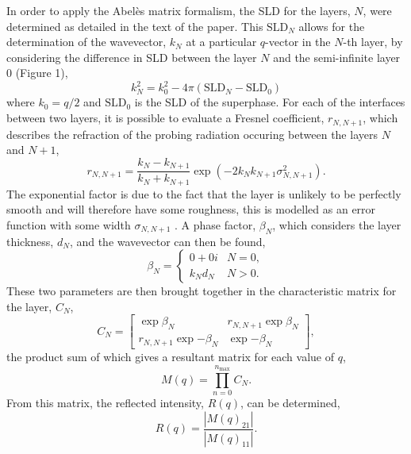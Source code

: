 \documentclass[amsmath,amssymb,superscriptaddress]{revtex4-1}
\begin{document}
In order to apply the Abel\`{e}s matrix formalism, the SLD for the layers, $N$, were determined as detailed in the text of the paper.
This $\text{SLD}_N$ allows for the determination of the wavevector, $k_N$ at a particular $q$-vector in the $N$-th layer, by considering the difference in SLD between the layer $N$ and the semi-infinite layer 0 (Figure 1),
%
\begin{equation}
	k_N^2 = k_0^2 - 4\pi(\text{SLD}_N - \text{SLD}_0)
\end{equation}
%
where $k_0 = q/2$ and $\text{SLD}_0$ is the SLD of the superphase.
For each of the interfaces between two layers, it is possible to evaluate a Fresnel coefficient, $r_{N,N+1}$, which describes the refraction of the probing radiation occuring between the layers $N$ and $N+1$,
%
\begin{equation}
	r_{N,N+1} = \frac{k_N - k_{N+1}}{k_N + k_{N+1}}\exp{(-2k_Nk_{N+1}\sigma^2_{N, N+1})}.
\end{equation}
%
The exponential factor is due to the fact that the layer is unlikely to be perfectly smooth and will therefore have some roughness, this is modelled as an error function with some width $\sigma_{N,N+1}$ \cite{Nevot1980}.
A phase factor, $\beta_N$, which considers the layer thickness, $d_N$, and the wavevector can then be found,
%
\begin{equation}
	\beta_N =
	\begin{cases}
		0 + 0i & N = 0, \\
		k_N d_N & N > 0.
	\end{cases}
\end{equation}
%
These two parameters are then brought together in the characteristic matrix for the layer, $C_N$,
%
\begin{equation}
	C_N =
	\begin{bmatrix}
		\exp{\beta_N} & r_{N,N+1} \exp{\beta_N} \\
		r_{N,N+1}\exp{-\beta_N} & \exp{-\beta_N}
	\end{bmatrix},
\end{equation}
%
the product sum of which gives a resultant matrix for each value of $q$,
%
\begin{equation}
	M(q) = \prod_{n=0}^{n_{\text{max}}} C_N.
\end{equation}
%
From this matrix, the reflected intensity, $R(q)$, can be determined,
%
\begin{equation}
	R(q) = \frac{|M(q)_{21}|}{|M(q)_{11}|}.
\end{equation}
%
\end{document}
